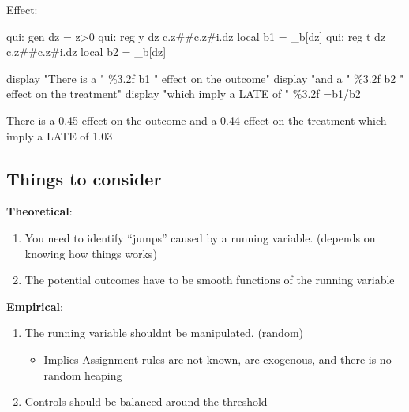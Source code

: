 \documentclass[
  letterpaper,
  DIV=11,
  numbers=noendperiod]{scrartcl}
\newenvironment{Shaded}{\begin{snugshade}}{\end{snugshade}}
\newcommand{\FunctionTok}[1]{\textcolor[rgb]{0.28,0.35,0.67}{#1}}
\newcommand{\KeywordTok}[1]{\textcolor[rgb]{0.00,0.23,0.31}{#1}}
\newcommand{\NormalTok}[1]{\textcolor[rgb]{0.00,0.23,0.31}{#1}}
\newcommand{\OtherTok}[1]{\textcolor[rgb]{0.00,0.23,0.31}{#1}}
\newcommand{\StringTok}[1]{\textcolor[rgb]{0.13,0.47,0.30}{#1}}
\providecommand{\tightlist}{%
  \setlength{\itemsep}{0pt}\setlength{\parskip}{0pt}}\usepackage{longtable,booktabs,array}
\begin{document}
Effect:

\begin{Shaded}
\begin{Highlighting}[]
\KeywordTok{qui}\NormalTok{: }\KeywordTok{gen}\NormalTok{ dz = z\textgreater{}0}
\KeywordTok{qui}\NormalTok{: }\KeywordTok{reg} \FunctionTok{y}\NormalTok{ dz c.z\#\#c.z\#i.dz}
\KeywordTok{local}\NormalTok{ b1 = \_b[dz]}
\KeywordTok{qui}\NormalTok{: }\KeywordTok{reg}\NormalTok{ t dz c.z\#\#c.z\#i.dz}
\KeywordTok{local}\NormalTok{ b2 = \_b[dz]}

\KeywordTok{display} \StringTok{"There is a "}\NormalTok{ \%3.2f }\OtherTok{\textasciigrave{}b1\textquotesingle{}} \StringTok{" effect on the outcome"}
\KeywordTok{display} \StringTok{"and a "}\NormalTok{ \%3.2f }\OtherTok{\textasciigrave{}b2\textquotesingle{}} \StringTok{" effect on the treatment"}
\KeywordTok{display} \StringTok{"which imply a LATE of "}\NormalTok{ \%3.2f }\OtherTok{\textasciigrave{}=\textasciigrave{}b1\textquotesingle{}}\NormalTok{/}\OtherTok{\textasciigrave{}b2\textquotesingle{}}\NormalTok{\textquotesingle{}}
\end{Highlighting}
\end{Shaded}

There is a 0.45 effect on the outcome and a 0.44 effect on the treatment
which imply a LATE of 1.03

\subsection{Things to consider}\label{things-to-consider}

\textbf{Theoretical}:

\begin{enumerate}
\def\labelenumi{\arabic{enumi}.}
\tightlist
\item
  You need to identify ``jumps'' caused by a running variable. (depends
  on knowing how things works)
\item
  The potential outcomes have to be smooth functions of the running
  variable
\end{enumerate}

\textbf{Empirical}:

\begin{enumerate}
\def\labelenumi{\arabic{enumi}.}
\setcounter{enumi}{2}
\tightlist
\item
  The running variable shouldnt be manipulated. (random)

  \begin{itemize}
  \tightlist
  \item
    Implies Assignment rules are not known, are exogenous, and there is
    no random heaping
  \end{itemize}
\item
  Controls should be balanced around the threshold
\end{enumerate}
\end{document}
